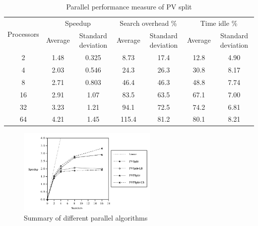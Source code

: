 \documentclass[12pt]{article}
\begin{document}
\begin{table}[H]
\centering
\begin{tabular}{|c|c|c|c|c|c|c|}
\hline
\multirow{2}{*}{Processors} & \multicolumn{2}{c|}{Speedup} & \multicolumn{2}{c|}{Search overhead \%} & \multicolumn{2}{c|}{Time idle \%} \\ \cline{2-7} 
                            & Average & Standard deviation & Average       & Standard deviation      & Average    & Standard deviation   \\ \hline
2                           & 1.48    & 0.325              & 8.73          & 17.4                    & 12.8       & 4.90                 \\ \hline
4                           & 2.03    & 0.546              & 24.3          & 26.3                    & 30.8       & 8.17                 \\ \hline
8                           & 2.71    & 0.803              & 46.4          & 46.3                    & 48.8       & 7.74                 \\ \hline
16                          & 2.91    & 1.07               & 83.5          & 63.5                    & 67.1       & 7.00                 \\ \hline
32                          & 3.23    & 1.21               & 94.1          & 72.5                    & 74.2       & 6.81                 \\ \hline
64                          & 4.21    & 1.45               & 115.4         & 81.2                    & 80.1       & 8.21                 \\ \hline
\end{tabular}
\caption{Parallel performance measure of PV split}
\end{table}

\begin{figure}[H]
  \centering
  \includegraphics[width=0.6\textwidth, height=0.4\textwidth]{summary_algorithms.png}
  \caption{Summary of different parallel algorithms}
\end{figure}
\end{document}
